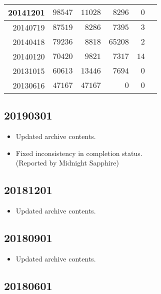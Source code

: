 \documentclass[hidelinks,a4paper,12pt]{article}
\begin{document}
\begin{center}
\begin{tabular}{|r|r|r|r|r|r|}
20141201         & $98547$          & $11028$        & $8296$           & $0$              \\ \hline
20140719         & $87519$          & $8286$         & $7395$           & $3$              \\ \hline
20140418         & $79236$          & $8818$         & $65208$          & $2$              \\ \hline
20140120         & $70420$          & $9821$         & $7317$           & $14$             \\ \hline
20131015         & $60613$          & $13446$        & $7694$           & $0$              \\ \hline
20130616         & $47167$          & $47167$        & $0$              & $0$              \\ \hline
\end{tabular}
\end{center}

\subsection{20190301}  \label{sec:changelog_20190301}

\begin{itemize}
\item Updated archive contents.
\item Fixed inconsistency in completion status.
  \\ (Reported by Midnight Sapphire)
\end{itemize}

\subsection{20181201}  \label{sec:changelog_20181201}

\begin{itemize}
\item Updated archive contents.
\end{itemize}

\subsection{20180901}  \label{sec:changelog_20180901}

\begin{itemize}
\item Updated archive contents.
\end{itemize}

\subsection{20180601}  \label{sec:changelog_20180601}
\end{document}

